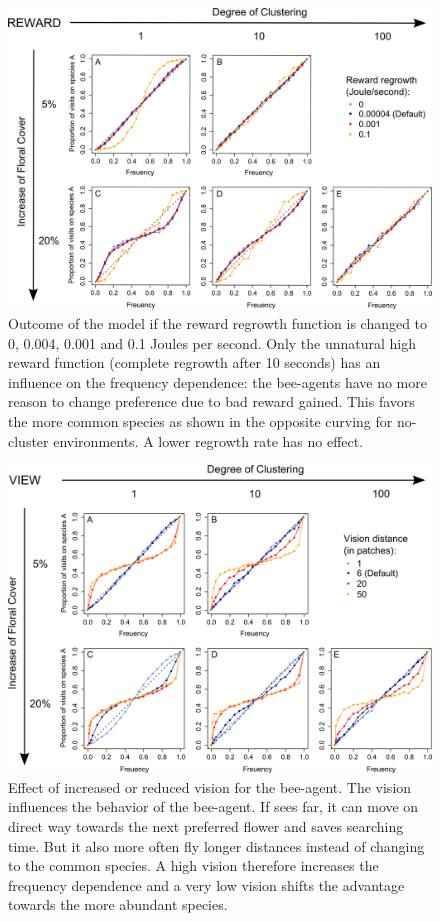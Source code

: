 \begin{figure} [!h] %
	\centering
	\includegraphics[width=14cm]{Images/SA_reward}
	\caption{Outcome of the model if the reward regrowth function is changed to 0, 0.004, 0.001 and 0.1 Joules per second. Only the unnatural high reward function (complete regrowth after 10 seconds) has an influence on the frequency dependence: the bee-agents have no more reason to change preference due to bad reward gained. This favors the more common species as shown in the opposite curving for no-cluster environments. A lower regrowth rate has no effect.} 
	\label{fig:SA_reward}
\end{figure}

\clearpage


\begin{figure} [!h]
	\centering
	\includegraphics[width=14cm]{Images/SA_view}
	\caption{Effect of increased or reduced vision for the bee-agent. The vision influences the behavior of the bee-agent. If sees far, it can move on direct way towards the next preferred flower and saves searching time. But it also more often fly longer distances instead of changing to the common species. A high vision therefore increases the frequency dependence and a very low vision shifts the advantage towards the more abundant species.}
	\label{fig:SA_view}
\end{figure}

